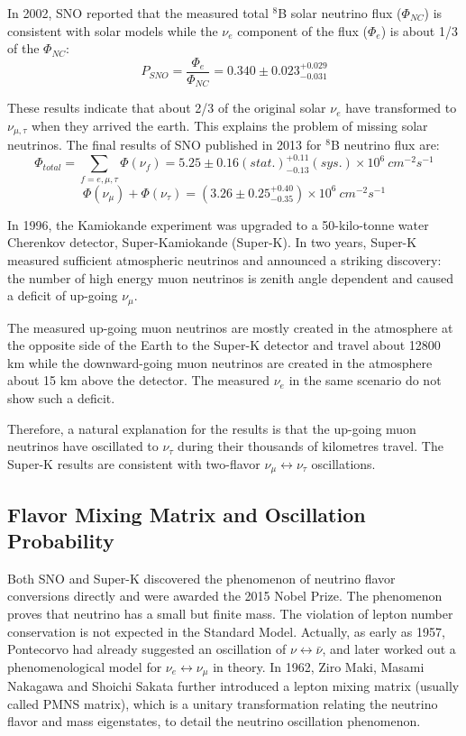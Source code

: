 \documentclass[preprint,12pt]{elsarticle}
\numberwithin{equation}{section}
\begin{document}
In 2002, SNO reported that the measured total $^8$B solar neutrino flux ($\Phi_{NC}$) is consistent with solar models while the $\nu_e$ component of the flux ($\Phi_e$) is about 1/3 of the $\Phi_{NC}$\cite{SNO}:
\[
P_{SNO} = \frac{\Phi_e}{\Phi_{NC}}= 0.340\pm0.023^{+0.029}_{-0.031}
\]

These results indicate that about 2/3 of the original solar $\nu_e$ have transformed to $\nu_{\mu,\tau}$ when they arrived the earth. This explains the problem of missing solar neutrinos. The final results of SNO published in 2013\cite{SNOresult} for $^8$B neutrino flux are:
\[
\Phi_{total} = \sum_{f=e,\mu,\tau}\Phi(\nu_f)= 5.25\pm0.16(stat.)_{-0.13}^{+0.11}(sys.)\times10^6~cm^{-2}s^{-1}
\]
\[\Phi(\nu_\mu)+\Phi(\nu_\tau)=(3.26\pm0.25^{+0.40}_{-0.35})\times 10^6~cm^{-2}s^{-1}
\]

In 1996, the Kamiokande experiment was upgraded to a 50-kilo-tonne water Cherenkov detector, Super-Kamiokande (Super-K). In two years, Super-K measured sufficient atmospheric neutrinos and announced a striking discovery: the number of high energy muon neutrinos is zenith angle dependent and caused a deficit of up-going $\nu_\mu$. 

The measured up-going muon neutrinos are mostly created in the atmosphere at the opposite side of the Earth to the Super-K detector and travel about 12800 km while the downward-going muon neutrinos are created in the atmosphere about 15 km above the detector. The measured $\nu_e$ in the same scenario do not show such a deficit.

Therefore, a natural explanation for the results is that the up-going muon neutrinos have oscillated to $\nu_\tau$ during their thousands of kilometres travel. The Super-K results are consistent with two-flavor $\nu_\mu\leftrightarrow\nu_\tau$ oscillations\cite{superK}.


\subsection{Flavor Mixing Matrix and Oscillation Probability}
Both SNO and Super-K discovered the phenomenon of neutrino flavor conversions directly and were awarded the 2015 Nobel Prize. The phenomenon proves that neutrino has a small but finite mass. The violation of lepton number conservation is not expected in the Standard Model. Actually, as early as 1957, Pontecorvo had already suggested an oscillation of $\nu\leftrightarrow\bar{\nu}$, and later worked out a phenomenological model for $\nu_e\leftrightarrow\nu_\mu$ in theory\cite{nobeldoc}. In 1962, Ziro Maki, Masami Nakagawa and Shoichi Sakata further introduced a lepton mixing matrix (usually called PMNS matrix), which is a unitary transformation relating the neutrino flavor and mass eigenstates, to detail the neutrino oscillation phenomenon.
\end{document}
